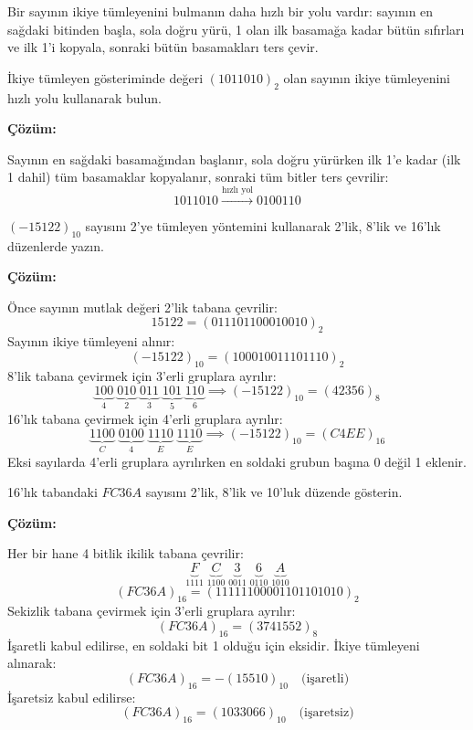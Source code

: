 Bir sayının ikiye tümleyenini bulmanın daha hızlı bir yolu vardır: sayının en sağdaki bitinden başla, sola doğru yürü, 1 olan ilk basamağa kadar bütün sıfırları ve ilk 1'i kopyala, sonraki bütün basamakları ters çevir.

\begin{ornek}[A.15]
İkiye tümleyen gösteriminde değeri $(1011010)_2$ olan sayının ikiye tümleyenini hızlı yolu kullanarak bulun.

\textbf{Çözüm:}

Sayının en sağdaki basamağından başlanır, sola doğru yürürken ilk 1'e kadar (ilk 1 dahil) tüm basamaklar kopyalanır, sonraki tüm bitler ters çevrilir:
\[
1011010 \xrightarrow{\text{hızlı yol}} 0100110
\]
\end{ornek}

\begin{ornek}[A.16]
$(-15122)_{10}$ sayısını 2'ye tümleyen yöntemini kullanarak 2'lik, 8'lik ve 16'lık düzenlerde yazın.

\textbf{Çözüm:}

Önce sayının mutlak değeri 2'lik tabana çevrilir:
\[
15122 = (011101100010010)_2
\]
Sayının ikiye tümleyeni alınır:
\[
(-15122)_{10} = (100010011101110)_2
\]
8'lik tabana çevirmek için 3'erli gruplara ayrılır:
\[
\underbrace{100}_{4}\;\underbrace{010}_{2}\;\underbrace{011}_{3}\;\underbrace{101}_{5}\;\underbrace{110}_{6} \implies (-15122)_{10} = (42356)_8
\]
16'lık tabana çevirmek için 4'erli gruplara ayrılır:
\[
\underbrace{1100}_{C}\;\underbrace{0100}_{4}\;\underbrace{1110}_{E}\;\underbrace{1110}_{E} \implies (-15122)_{10} = (C4EE)_{16}
\]
Eksi sayılarda 4'erli gruplara ayrılırken en soldaki grubun başına 0 değil 1 eklenir.
\end{ornek}

\begin{ornek}[A.17]
16'lık tabandaki $FC36A$ sayısını 2'lik, 8'lik ve 10'luk düzende gösterin.

\textbf{Çözüm:}

Her bir hane 4 bitlik ikilik tabana çevrilir:
\[
\underbrace{F}_{1111}\;\underbrace{C}_{1100}\;\underbrace{3}_{0011}\;\underbrace{6}_{0110}\;\underbrace{A}_{1010}
\]
\[
(FC36A)_{16} = (11111100001101101010)_2
\]
Sekizlik tabana çevirmek için 3'erli gruplara ayrılır:
\[
(FC36A)_{16} = (3741552)_8
\]
İşaretli kabul edilirse, en soldaki bit 1 olduğu için eksidir. İkiye tümleyeni alınarak:
\[
(FC36A)_{16} = -(15510)_{10} \quad \text{(işaretli)}
\]
İşaretsiz kabul edilirse:
\[
(FC36A)_{16} = (1033066)_{10} \quad \text{(işaretsiz)}
\]
\end{ornek}

